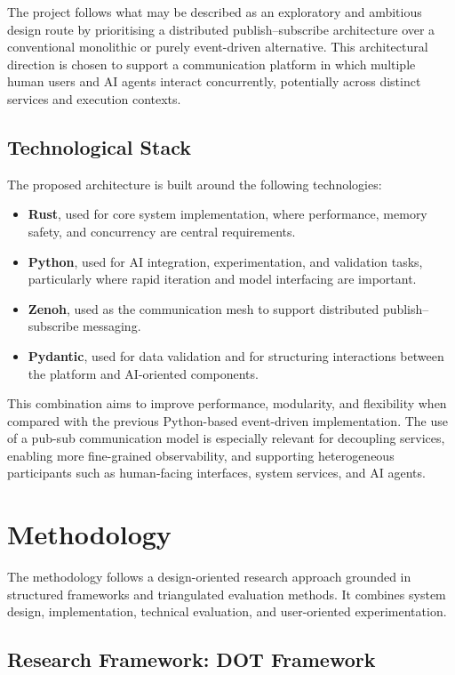 \documentclass[11pt]{article}
\begin{document}
The project follows what may be described as an exploratory and ambitious design route by prioritising a distributed publish--subscribe architecture over a conventional monolithic or purely event-driven alternative. This architectural direction is chosen to support a communication platform in which multiple human users and AI agents interact concurrently, potentially across distinct services and execution contexts.

\subsection{Technological Stack}

The proposed architecture is built around the following technologies:

\begin{itemize}
    \item \textbf{Rust}, used for core system implementation, where performance, memory safety, and concurrency are central requirements.
    \item \textbf{Python}, used for AI integration, experimentation, and validation tasks, particularly where rapid iteration and model interfacing are important.
    \item \textbf{Zenoh}, used as the communication mesh to support distributed publish--subscribe messaging.
    \item \textbf{Pydantic}, used for data validation and for structuring interactions between the platform and AI-oriented components.
\end{itemize}

This combination aims to improve performance, modularity, and flexibility when compared with the previous Python-based event-driven implementation. The use of a pub-sub communication model is especially relevant for decoupling services, enabling more fine-grained observability, and supporting heterogeneous participants such as human-facing interfaces, system services, and AI agents.

\section{Methodology}

The methodology follows a design-oriented research approach grounded in structured frameworks and triangulated evaluation methods. It combines system design, implementation, technical evaluation, and user-oriented experimentation.

\subsection{Research Framework: DOT Framework}
\end{document}
